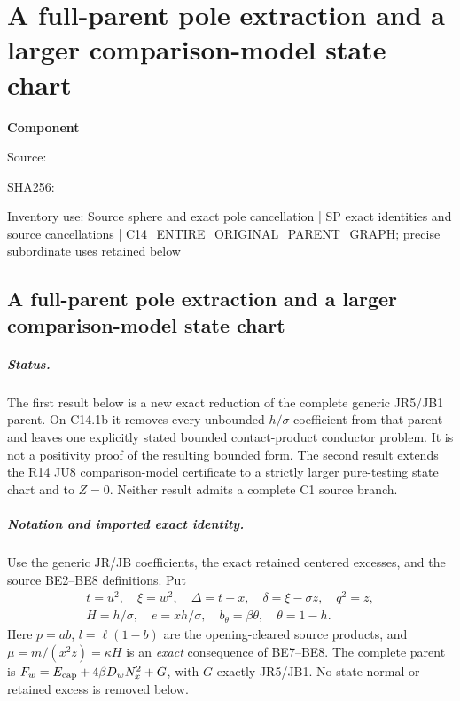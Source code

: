 \chapter{A full-parent pole extraction and a larger comparison-model state chart}
\label{component:pfeca652aef94}
\noindent\textbf{Component }\par
{\small\noindent Source: \par}
{\small\noindent SHA256: \par}
{\small\noindent Inventory use: Source sphere and exact pole cancellation | SP exact identities and source cancellations | C14\_\allowbreak{}ENTIRE\_\allowbreak{}ORIGINAL\_\allowbreak{}PARENT\_\allowbreak{}GRAPH; precise subordinate uses retained below\par}
\medskip
\section{A full-parent pole extraction and a larger comparison-model state chart}
\label{pfeca652aef94:sec:r17-c1-sphere}

\paragraph{Status.}
The first result below is a new exact reduction of the complete generic
JR5/JB1 parent. On C14.1b it removes every unbounded $h/\sigma$
coefficient from that parent and leaves one explicitly stated bounded
contact-product conductor problem. It is not a positivity proof of the
resulting bounded form. The second result extends the R14 JU8
comparison-model certificate to a strictly larger pure-testing state
chart and to $Z=0$. Neither result admits a complete C1 source branch.

\paragraph{Notation and imported exact identity.}
Use the generic JR/JB coefficients, the exact retained centered excesses,
and the source BE2--BE8 definitions. Put
\[
\begin{gathered}
 t=u^2,\quad \xi=w^2,\quad \Delta=t-x,\quad
 \delta=\xi-\sigma z,\quad q^2=z,\\
 H=h/\sigma,\quad e=xh/\sigma,\quad b_\theta=\beta\theta,
 \quad\theta=1-h.
\end{gathered}
\]
Here $p=ab$, $l=\ell(1-b)$ are the opening-cleared source products,
and $\mu=m/(x^2z)=\kappa H$ is an \emph{exact} consequence of BE7--BE8.
The complete parent is
$F_w=E_{\rm cap}+4\beta D_wN_x^2+G$, with $G$ exactly JR5/JB1.
No state normal or retained excess is removed below.

